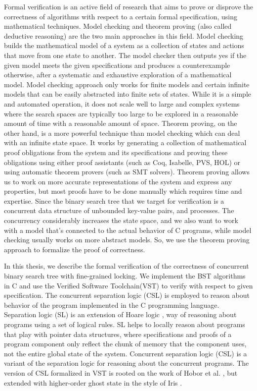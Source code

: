 \documentclass[acmsmall,screen]{acmart}\settopmatter{printfolios=true}
\begin{document}
Formal verification is an active field of research that aims to prove or disprove the correctness of algorithms with respect to a certain formal specification, using mathematical techniques. Model checking and theorem proving  (also called deductive reasoning) are the two main approaches in this field. Model checking builds the mathematical model of a system as a collection of states and actions that move from one state to another. The model checker then outputs yes if the given model meets the given specifications and produces a counterexample otherwise, after a systematic and exhaustive exploration of a mathematical model. Model checking approach only works for finite models and certain infinite models that can be easily abstracted into finite sets of states. While it is a simple and automated operation, it does not scale well to large and complex systems where the search spaces are typically too large to be explored in a reasonable amount of time with a reasonable amount of space. Theorem proving, on the other hand, is a more powerful technique than model checking which can deal with an infinite state space. It works by generating a collection of mathematical proof obligations from the system and its specifications and proving these obligations using either proof assistants (such as Coq, Isabelle, PVS, HOL) or using automatic theorem provers (such as SMT solvers). Theorem proving allows us to work on more accurate representations of the system and express any properties, but most proofs have to be done manually which requires time and expertise. Since the binary search tree that we target for verification is a concurrent data structure of unbounded key-value pairs, and processes. The concurrency considerably increases the state space, and we also want to work with a model that's connected to the actual behavior of C programs, while model checking usually works on more abstract models. So, we use the theorem proving approach to formalize the proof of correctness.

In this thesis, we describe the formal verification of the correctness of concurrent binary search tree with fine-grained locking. We implement the BST algorithms in C and use the Verified Software Toolchain(VST) \cite{plfcc} to verify with respect to given specification. The concurrent separation logic (CSL) is employed to reason about behavior of the program implemented in the C programming language. Separation logic (SL) \cite{seplogic} is an extension of Hoare logic \cite{hoare}, way of reasoning about programs using a set of logical rules. SL helps to locally reason about programs that play with pointer data structures, where specifications and proofs of a program component only reflect the chunk of memory that the component uses, not the entire global state of the system. Concurrent separation logic (CSL) is a variant of the separation logic for reasoning about the concurrent programs. The version of CSL formalized in VST is rooted on the work of Hobor et al. \cite{oraclesematic}, but extended with higher-order ghost state in the style of Iris \cite{higherorderghoststate}.
\end{document}
